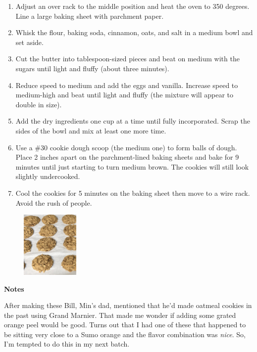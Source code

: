 \documentclass{article}
\begin{document}
\begin{enumerate}
      \item Adjust an over rack to the middle position and heat the oven to 350 degrees. Line a large baking sheet
            with parchment paper.
      \item Whisk the flour, baking soda, cinnamon, oats, and salt in a medium bowl and set aside.
      \item Cut the butter into tablespoon-sized pieces and beat on medium with the sugars until light and fluffy
            (about three minutes).
      \item Reduce speed to medium and add the eggs and vanilla. Increase speed to medium-high and beat until
            light and fluffy (the mixture will appear to double in size).
      \item Add the dry ingredients one cup at a time until fully incorporated. Scrap the sides of the
            bowl and mix at least one more time.
      \item Use a \#30 cookie dough scoop (the medium one) to form balls of dough.
            Place 2 inches apart on the parchment-lined baking sheets and bake for 9 minutes until just starting
            to turn medium brown. The cookies will still look slightly undercooked.
      \item Cool the cookies for 5 minutes on the baking sheet then move to a wire rack. Avoid the rush of people.
\end{enumerate}


\begin{figure}
      \begin{center}
            \includegraphics[width=0.25\textwidth]{oatmeal-cookies.png}
      \end{center}
\end{figure}

\bigskip

\textbf{Notes}

After making these Bill, Min's dad, mentioned that he'd made oatmeal cookies in the past using
Grand Marnier. That made me wonder if adding some grated orange peel would be good. Turns out that
I had one of these that happened to be sitting very close to a Sumo orange and the flavor
combination was \emph{nice}. So, I'm tempted to do this in my next batch.
\end{document}
